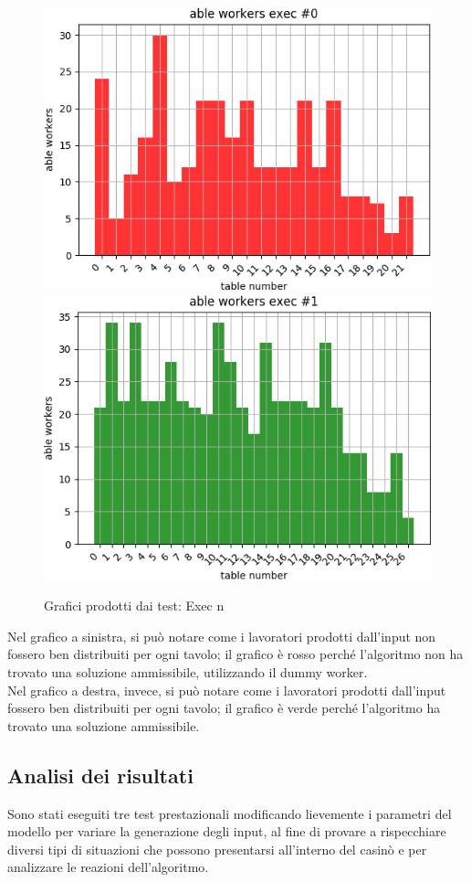     \begin{figure}[!h]
        \begin{widepage}
            \centering
            \includegraphics[width=.49\textwidth]{../immagini/exec_0.png}\hfil
            \includegraphics[width=.49\textwidth]{../immagini/exec_1.png}
            \caption{Grafici prodotti dai test: Exec n}
        \end{widepage}
    \end{figure}
    \FloatBarrier
    \noindent
    Nel grafico a sinistra, si può notare come i lavoratori prodotti dall’input non fossero ben distribuiti per ogni tavolo; il grafico è rosso perché l’algoritmo non ha trovato una soluzione ammissibile, utilizzando il dummy worker.\\
    Nel grafico a destra, invece, si può notare come i lavoratori prodotti dall’input fossero ben distribuiti per ogni tavolo; il grafico è verde perché l’algoritmo ha trovato una soluzione ammissibile.
   
   \subsection{Analisi dei risultati}
   Sono stati eseguiti tre test prestazionali modificando lievemente i parametri del modello per variare la generazione degli input, al fine di provare a rispecchiare diversi tipi di situazioni che possono presentarsi all'interno del casinò e per analizzare le reazioni dell'algoritmo.
